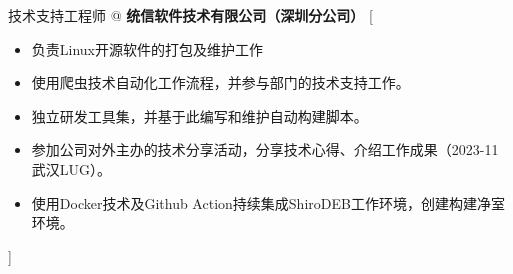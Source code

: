 \documentclass[zh]{resume}
\begin{document}

\begin{experiences}
    {技术支持工程师 @ \textbf{统信软件技术有限公司（深圳分公司）}}%
    [\begin{itemize}
		\item 负责Linux开源软件的打包及维护工作
		\item 使用爬虫技术自动化工作流程，并参与部门的技术支持工作。
		\item 独立研发工具集，并基于此编写和维护自动构建脚本。
		\item 参加公司对外主办的技术分享活动，分享技术心得、介绍工作成果（2023-11 武汉LUG）。
		\item 使用Docker技术及Github Action持续集成ShiroDEB工作环境，创建构建净室环境。
    \end{itemize}]
\end{experiences}
\end{document}

